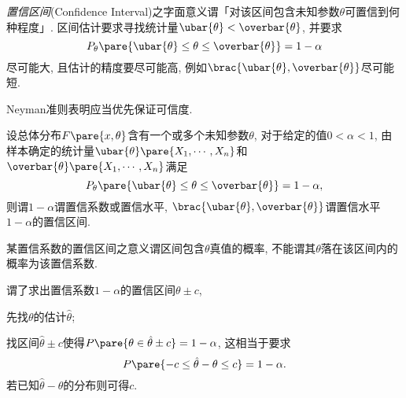 \documentclass[../Statistics.tex]{subfiles}
\begin{document}
\emph{置信区间}(Confidence Interval)之字面意义谓「对该区间包含未知参数$\theta$可置信到何种程度」. 区间估计要求寻找统计量$\ubar{\theta}<\overbar{\theta}$, 并要求
\[ P_\theta\pare{\ubar{\theta} \le \theta \le \overbar{\theta}} = 1-\alpha \]
尽可能大, 且估计的精度要尽可能高, 例如$\brac{\ubar{\theta},\overbar{\theta}}$尽可能短.
\begin{remark}
    Neyman准则表明应当优先保证可信度.
\end{remark}
\begin{definition}
    设总体分布$F\pare{x,\theta}$含有一个或多个未知参数$\theta$, 对于给定的值$0<\alpha<1$, 由样本确定的统计量$\ubar{\theta}\pare{X_1,\cdots,X_n}$和$\overbar{\theta}\pare{X_1,\cdots,X_n}$满足
    \[ P_\theta\pare{\ubar{\theta} \le \theta \le \overbar{\theta}} = 1-\alpha, \]
    则谓$1-\alpha$谓置信系数或置信水平, $\brac{\ubar{\theta},\overbar{\theta}}$谓置信水平$1-\alpha$的置信区间.
\end{definition}
\begin{remark}
    某置信系数的置信区间之意义谓区间包含$\theta$真值的概率, 不能谓其$\theta$落在该区间内的概率为该置信系数.
\end{remark}
谓了求出置信系数$1-\alpha$的置信区间$\theta\pm c$,
\begin{cenum}
    \item 先找$\theta$的估计$\hat\theta$;
    \item 找区间$\hat\theta\pm c$使得$P\pare{\theta\in\hat\theta\pm c} = 1-\alpha$, 这相当于要求
    \[ P\pare{-c \le \hat\theta - \theta \le c} = 1-\alpha. \]
    若已知$\hat\theta - \theta$的分布则可得$c$.
\end{cenum}
\end{document}
